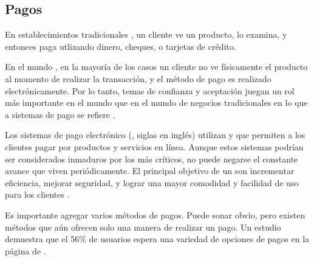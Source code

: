 \subsection{Pagos}\label{cap:solucionImplementada:section:dashboard:subsection:payment}
	En establecimientos tradicionales \brickandmortar, un cliente ve un producto, lo examina, y entonces paga utlizando dinero, cheques, o tarjetas de crédito.

	En el mundo \ecommerceCOM, en la mayoría de los casos un cliente no ve físicamente el producto al momento de realizar la transacción, y el método de pago es realizado electrónicamente. Por lo tanto, temas de confianza y aceptación juegan un rol más importante en el mundo \ecommerceCOM que en el mundo de negocios tradicionales en lo que a sistemas de pago se refiere \cite{bidgoli2002electronic}.

	Los sistemas de pago electrónico (\epsSiglasCOM, siglas en inglés) utilizan \hardwarePC y \softwarePC que permiten a los clientes pagar por productos y servicios en línea. Aunque estos sistemas podrían ser considerados inmaduros por los más críticos, no puede negarse el constante avance que viven periódicamente. El principal objetivo de un \epsSiglasCOM son incrementar eficiencia, mejorar seguridad, y lograr una mayor comodidad y facilidad de uso para los clientes \cite{bidgoli2002electronic}.

	Es importante agregar varios métodos de pagos. Puede sonar obvio, pero existen métodos que aún ofrecen solo una manera de realizar un pago. Un estudio demuestra que el 56\% de usuarios espera una variedad de opciones de pagos en la página de \checkoutCOM \cite{online_kissmetrics_easy_payment_process}.

